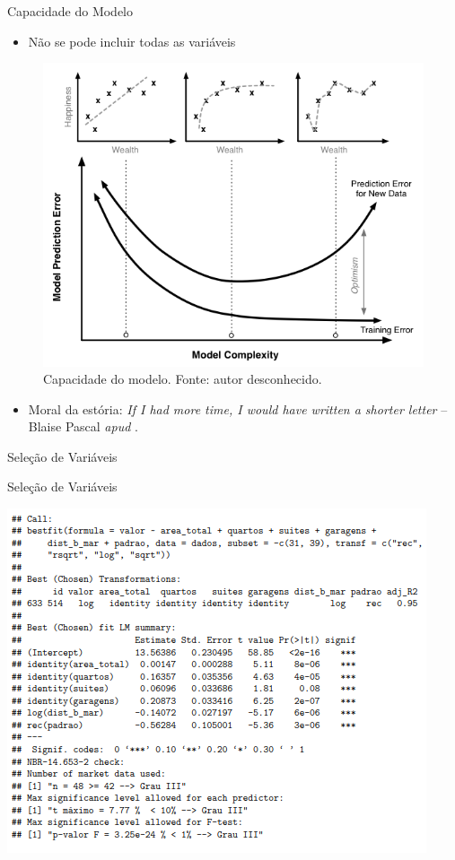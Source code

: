 \documentclass[9pt,ignorenonframetext,aspectratio=169]{beamer}
\providecommand{\tightlist}{%
  \setlength{\itemsep}{0pt}\setlength{\parskip}{0pt}}
\begin{document}
\begin{frame}{Capacidade do Modelo}
\protect\hypertarget{capacidade-do-modelo}{}

\begin{itemize}[<+->]
\tightlist
\item
  Não se pode incluir todas as variáveis
\end{itemize}

\begin{figure}

{\centering \includegraphics[width=0.4\linewidth]{../../images/model_complexity} 

}

\caption{Capacidade do modelo. Fonte: autor desconhecido.}\label{fig:unnamed-chunk-4}
\end{figure}

\begin{itemize}[<+->]
\tightlist
\item
  Moral da estória:
  \emph{If I had more time, I would have written a shorter
  letter} -- Blaise Pascal \emph{apud} \textcite{matloff2017}.
\end{itemize}

\end{frame}

\begin{frame}{Seleção de Variáveis}
\protect\hypertarget{seleuxe7uxe3o-de-variuxe1veis}{}

\end{frame}

\begin{frame}{Seleção de Variáveis}
\protect\hypertarget{seleuxe7uxe3o-de-variuxe1veis-1}{}

\begin{center}\includegraphics[width=0.7\linewidth]{../../images/modelo} \end{center}

\end{frame}
\end{document}
